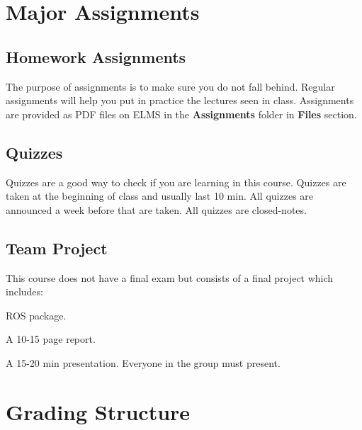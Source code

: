 \documentclass[11pt,usenames,dvipsnames,svgnames,x11names,letterpaper]{article}
\newcommand{\lefthead}[2]{\noindent\textbf{#1}\hfill\\[#2]}
\newcommand{\mynote}{\textcolor{DodgerBlue2}{{\faEdit}}\xspace}
\begin{document}
\section{Major Assignments}

\subsection{Homework Assignments}
The purpose of assignments is to make sure you do not fall behind. Regular assignments will help you put in practice the lectures seen in class. Assignments are provided as PDF files on ELMS in the \textbf{Assignments} folder in \textbf{Files} section.

\subsection{Quizzes}
Quizzes are a good way to check if you are learning in this course. Quizzes are taken at the beginning of class and usually last 10 min. All quizzes are announced a week before that are taken. All quizzes are closed-notes. 

\subsection{Team Project}
This course does not have a final exam but consists of a final project which includes:
\begin{compactenum}
    \item ROS package.
    \item A 10-15 page report.
    \item A 15-20 min presentation. \mynote Everyone in the group must present.
\end{compactenum}


\section{Grading Structure}
\end{document}
